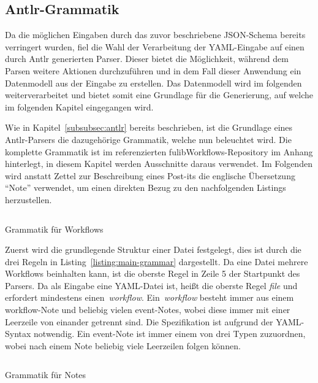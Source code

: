 \subsection{Antlr-Grammatik}\label{subsec:antlr-grammatik}
Da die möglichen Eingaben durch das zuvor beschriebene JSON-Schema bereits verringert wurden, fiel die Wahl der Verarbeitung der YAML-Eingabe auf einen durch \ac{Antlr} generierten Parser.
Dieser bietet die Möglichkeit, während dem Parsen weitere Aktionen durchzuführen und in dem Fall dieser Anwendung ein Datenmodell aus der Eingabe zu erstellen.
Das Datenmodell wird im folgenden weiterverarbeitet und bietet somit eine Grundlage für die Generierung, auf welche im folgenden Kapitel eingegangen wird.

Wie in Kapitel~\ref{subsubsec:antlr} bereits beschrieben, ist die Grundlage eines \ac{Antlr}-Parsers die dazugehörige Grammatik, welche nun beleuchtet wird.
Die komplette Grammatik ist im referenzierten fulibWorkflows-Repository im Anhang hinterlegt, in diesem Kapitel werden Ausschnitte daraus verwendet.
Im Folgenden wird anstatt Zettel zur Beschreibung eines Post-its die englische Übersetzung ``Note'' verwendet, um einen direkten Bezug zu den nachfolgenden Listings herzustellen.

\begin{listing}[!ht]
    \inputminted[firstnumber=5]{antlr-java}{listings/3.1.3/Main.g4}
    \caption{Grammatik für Workflows}
    \label{listing:main-grammar}
\end{listing}

Zuerst wird die grundlegende Struktur einer Datei festgelegt, dies ist durch die drei Regeln in Listing~\ref{listing:main-grammar} dargestellt.
Da eine Datei mehrere Workflows beinhalten kann, ist die oberste Regel in Zeile 5 der Startpunkt des Parsers.
Da als Eingabe eine YAML-Datei ist, heißt die oberste Regel \textit{file} und erfordert mindestens einen~\textit{workflow}.
Ein~\textit{workflow} besteht immer aus einem workflow-Note und beliebig vielen event-Notes, wobei diese immer mit einer Leerzeile von einander getrennt sind.
Die Spezifikation ist aufgrund der YAML-Syntax notwendig.
Ein event-Note ist immer einem von drei Typen zuzuordnen, wobei nach einem Note beliebig viele Leerzeilen folgen können.

\begin{listing}[!ht]
    \inputminted[firstnumber=11]{antlr-java}{listings/3.1.3/Note.g4}
    \caption{Grammatik für Notes}
    \label{listing:note-grammar}
\end{listing}

